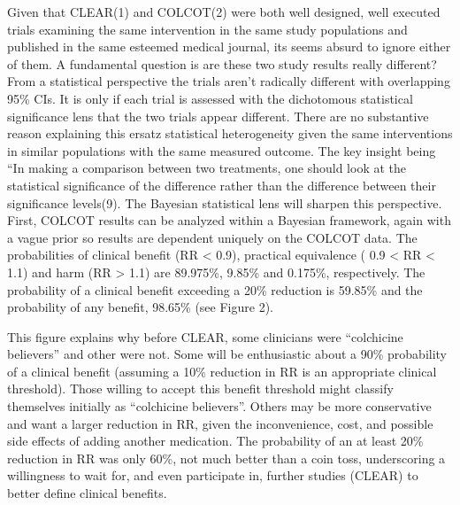 \documentclass[
  letterpaper,
  DIV=11,
  numbers=noendperiod]{scrartcl}
\begin{document}
Given that CLEAR(1) and COLCOT(2) were both well designed, well executed
trials examining the same intervention in the same study populations and
published in the same esteemed medical journal, its seems absurd to
ignore either of them. A fundamental question is are these two study
results really different? From a statistical perspective the trials
aren't radically different with overlapping 95\% CIs. It is only if each
trial is assessed with the dichotomous statistical significance lens
that the two trials appear different. There are no substantive reason
explaining this ersatz statistical heterogeneity given the same
interventions in similar populations with the same measured outcome. The
key insight being ``In making a comparison between two treatments, one
should look at the statistical significance of the difference rather
than the difference between their significance levels(9). The Bayesian
statistical lens will sharpen this perspective.\\

First, COLCOT results can be analyzed within a Bayesian framework, again
with a vague prior so results are dependent uniquely on the COLCOT data.
The probabilities of clinical benefit (RR \textless{} 0.9), practical
equivalence ( 0.9 \textless{} RR \textless{} 1.1) and harm (RR
\textgreater{} 1.1) are 89.975\%, 9.85\% and 0.175\%, respectively. The
probability of a clinical benefit exceeding a 20\% reduction is 59.85\%
and the probability of any benefit, 98.65\% (see Figure 2).

This figure explains why before CLEAR, some clinicians were ``colchicine
believers'' and other were not. Some will be enthusiastic about a 90\%
probability of a clinical benefit (assuming a 10\% reduction in RR is an
appropriate clinical threshold). Those willing to accept this benefit
threshold might classify themselves initially as ``colchicine
believers''. Others may be more conservative and want a larger reduction
in RR, given the inconvenience, cost, and possible side effects of
adding another medication. The probability of an at least 20\% reduction
in RR was only 60\%, not much better than a coin toss, underscoring a
willingness to wait for, and even participate in, further studies
(CLEAR) to better define clinical benefits.\\
\end{document}
